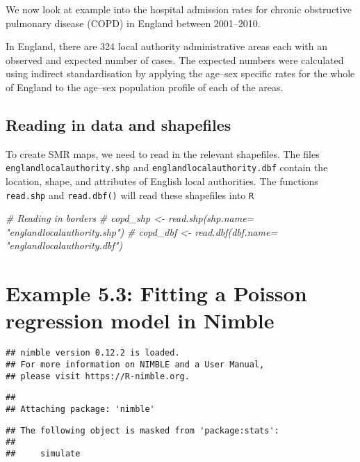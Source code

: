 \documentclass[
]{book}
\newenvironment{Shaded}{\begin{snugshade}}{\end{snugshade}}
\newcommand{\CommentTok}[1]{\textcolor[rgb]{0.56,0.35,0.01}{\textit{#1}}}
\begin{document}
We now look at example into the hospital admission rates for chronic obstructive pulmonary disease (COPD) in England between 2001--2010.

In England, there are 324 local authority administrative areas each with an observed and expected number of cases. The expected numbers were calculated using indirect standardisation by applying the age--sex specific rates for the whole of England to the age--sex population profile of each of
the areas.

\hypertarget{reading-in-data-and-shapefiles}{%
\subsection{Reading in data and shapefiles}\label{reading-in-data-and-shapefiles}}

To create SMR maps, we need to read in the relevant shapefiles. The files
\texttt{englandlocalauthority.shp} and \texttt{englandlocalauthority.dbf} contain the location, shape, and attributes of English local authorities. The functions \texttt{read.shp} and \texttt{read.dbf()} will read these shapefiles into \texttt{R}

\begin{Shaded}
\begin{Highlighting}[]
\CommentTok{\# Reading in borders}
\CommentTok{\# copd\_shp \textless{}{-} read.shp(shp.name= "englandlocalauthority.shp")}
\CommentTok{\# copd\_dbf \textless{}{-} read.dbf(dbf.name= "englandlocalauthority.dbf")}
\end{Highlighting}
\end{Shaded}

\hypertarget{example-5.3-fitting-a-poisson-regression-model-in-nimble}{%
\section{Example 5.3: Fitting a Poisson regression model in Nimble}\label{example-5.3-fitting-a-poisson-regression-model-in-nimble}}

\begin{verbatim}
## nimble version 0.12.2 is loaded.
## For more information on NIMBLE and a User Manual,
## please visit https://R-nimble.org.
\end{verbatim}

\begin{verbatim}
## 
## Attaching package: 'nimble'
\end{verbatim}

\begin{verbatim}
## The following object is masked from 'package:stats':
## 
##     simulate
\end{verbatim}
\end{document}
